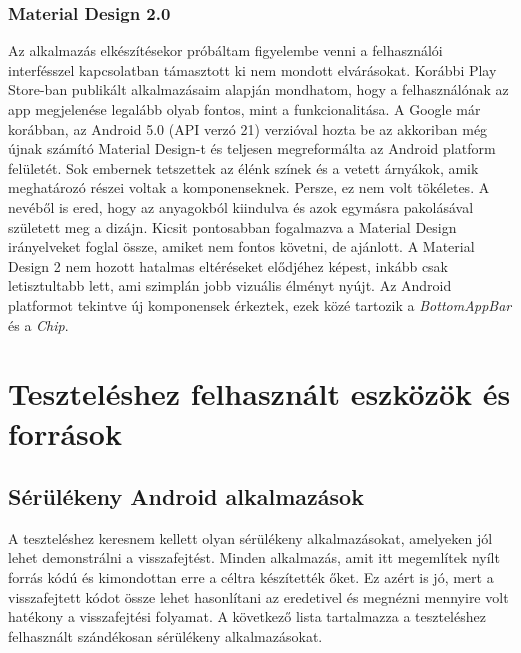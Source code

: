 \documentclass{thesis-ekf}
\theoremstyle{definition}
\theoremstyle{remark}
\begin{document}


\subsection{Material Design 2.0}

Az alkalmazás elkészítésekor próbáltam figyelembe venni a felhasználói interfésszel kapcsolatban támasztott ki nem mondott elvárásokat.
Korábbi Play Store-ban publikált alkalmazásaim alapján mondhatom, hogy a felhasználónak az app megjelenése legalább olyab fontos, mint a funkcionalitása.
A Google már korábban, az Android 5.0 (API verzó 21) verzióval hozta be az akkoriban még újnak számító Material Design-t és teljesen megreformálta az Android platform felületét.
Sok embernek tetszettek az élénk színek és a vetett árnyákok, amik meghatározó részei voltak a komponenseknek. Persze, ez nem volt tökéletes.
A nevéből is ered, hogy az anyagokból kiindulva és azok egymásra pakolásával született meg a dizájn. 
Kicsit pontosabban fogalmazva a Material Design irányelveket foglal össze, amiket nem fontos követni, de ajánlott. 
A Material Design 2 nem hozott hatalmas eltéréseket elődjéhez képest, inkább csak letisztultabb lett, ami szimplán jobb vizuális élményt nyújt.
Az Android platformot tekintve új komponensek érkeztek, ezek közé tartozik a \emph{BottomAppBar} és a \emph{Chip}.


\chapter{Teszteléshez felhasznált eszközök és források}\label{teszteles}

\section{Sérülékeny Android alkalmazások}

A teszteléshez keresnem kellett olyan sérülékeny alkalmazásokat, amelyeken jól lehet demonstrálni a visszafejtést.
Minden alkalmazás, amit itt megemlítek nyílt forrás kódú és kimondottan erre a céltra készítették őket.
Ez azért is jó, mert a visszafejtett kódot össze lehet hasonlítani az eredetivel és megnézni mennyire volt hatékony a visszafejtési folyamat.
A következő lista tartalmazza a teszteléshez felhasznált szándékosan sérülékeny alkalmazásokat.
\end{document}

